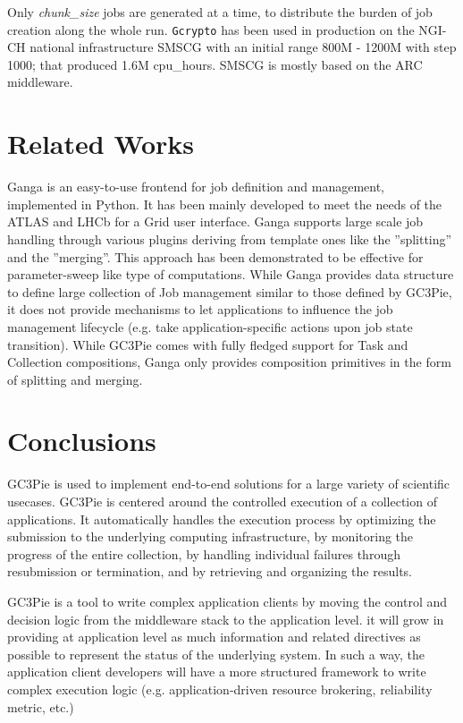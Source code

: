 \documentclass{PoS}
\begin{document}
Only \emph{chunk\_size} jobs are generated at a time, to distribute the
burden of job creation along the whole run.
\texttt{Gcrypto} has been used in production on the NGI-CH national
infrastructure SMSCG \cite{smscg} with an initial range 800M - 1200M
with step 1000; that produced 1.6M cpu\_hours. SMSCG is mostly based
on the ARC middleware.

\section{Related Works}
Ganga \cite{ganga} is an easy-to-use frontend for job definition and
management, implemented in Python. It has been mainly developed to
meet the needs of the ATLAS and LHCb for a Grid user interface. Ganga
supports large scale job handling through various plugins deriving
from template ones like the ''splitting'' and the ''merging''. This
approach has been demonstrated to be effective for parameter-sweep
like type of computations. While Ganga provides data structure
to define large collection of Job management similar to those defined
by GC3Pie, it does not provide mechanisms to let applications to
influence the job management lifecycle (e.g. take application-specific
actions upon job state transition). While GC3Pie comes with fully
fledged support for Task and Collection compositions, Ganga only
provides composition primitives in the form of splitting and merging.

\section{Conclusions}
GC3Pie is used to implement end-to-end solutions
for a large variety of scientific usecases. GC3Pie is centered
around the controlled execution of a collection of
applications. It automatically handles the execution process by
optimizing the submission to the underlying computing
infrastructure, by monitoring the progress of the entire
collection, by handling individual failures through resubmission or
termination, and by retrieving and organizing the results.
    
GC3Pie is a tool to write complex
application clients by moving the control and decision
logic from the middleware stack to the application level. it will grow
in providing at application level as much information
and related directives as possible to represent the status of the
underlying system. In such a way, the application client
developers will have a more structured framework to write complex
execution logic (e.g. application-driven resource brokering,
reliability metric, etc.)
\end{document}
